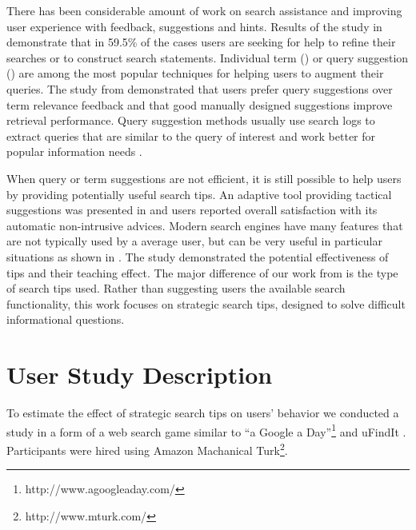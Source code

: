 \documentclass{sig-alternate}
\begin{document}
There has been considerable amount of work on search assistance and improving user experience with feedback, suggestions and hints.
Results of the study in \cite{xie2009understanding} demonstrate that in 59.5\% of the cases users are seeking for help to refine their searches or to construct search statements.
Individual term (\cite{ruthven2003survey}) or query suggestion (\cite{Bhatia:2011:QSA:2009916.2010023, Cao:2008:CQS:1401890.1401995,Jones:2006:GQS:1135777.1135835}) are among the most popular techniques for helping users to augment their queries.
The study from \cite{Kelly:2009:CQT:1571941.1572006} demonstrated that users prefer query suggestions over term relevance feedback and that good manually designed suggestions improve retrieval performance.
Query suggestion methods usually use search logs to extract queries that are similar to the query of interest and work better for popular information needs \cite{Bhatia:2011:QSA:2009916.2010023}.

When query or term suggestions are not efficient, it is still possible to help users by providing potentially useful search tips.
An adaptive tool providing tactical suggestions was presented in \cite{Kriewel2010} and users reported overall satisfaction with its automatic non-intrusive advices.
Modern searc\setlength{\floatsep}{3pt plus 1.0pt minus 1.0pt}h engines have many features that are not typically used by a average user, but can be very useful in particular situations as shown in \cite{Moraveji:2011:MIU:2009916.2009966}. The study demonstrated the potential effectiveness of tips and their teaching effect.
The major difference of our work from \cite{Moraveji:2011:MIU:2009916.2009966} is the type of search tips used.
Rather than suggesting users the available search functionality, this work focuses on strategic search tips, designed to solve difficult informational questions.

\section{User Study Description}

To estimate the effect of strategic search tips on users' behavior we conducted a study in a form of a web search game similar to ``a Google a Day''\footnote{http://www.agoogleaday.com/} and uFindIt \cite{Ageev:2011:FYG:2009916.2009965}. Participants were hired using Amazon Machanical Turk\footnote{http://www.mturk.com/}. 
\end{document}
